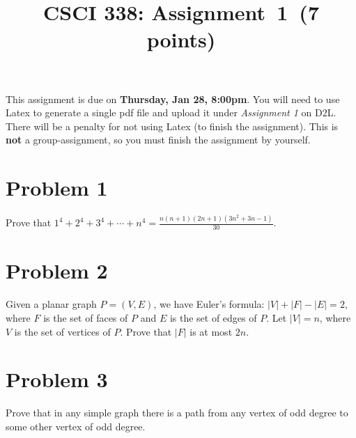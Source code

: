 \documentclass[11pt]{article}
\begin{document}
\date{}

\title{CSCI 338: Assignment~1~(7 points)}



\maketitle

\noindent
This assignment is due on {\bf Thursday, Jan 28, 8:00pm}. You will need to
use Latex to generate a single pdf file and upload it under {\em Assignment 1}
on D2L. There will be a penalty for not using Latex (to finish the assignment).
This is {\bf not} a group-assignment, so you must finish the assignment by
yourself.

\section*{Problem 1}

Prove that $1^4+2^4+3^4+\cdots+n^4=\frac{n(n+1)(2n+1)(3n^2+3n-1)}{30}$.
\newline


\section*{Problem 2}

Given a planar graph $P=(V,E)$, we have Euler's formula:
$|V|+|F|-|E|=2$, where $F$ is the set of faces of $P$ and $E$ is the
set of edges of $P$.
Let $|V|=n$, where $V$ is the set of vertices of $P$.
Prove that $|F|$ is at most $2n$.
\newline


\section*{Problem 3}

Prove that in any simple graph there is a path from any vertex of odd degree
to some other vertex of odd degree.
\newline

\end{document}
